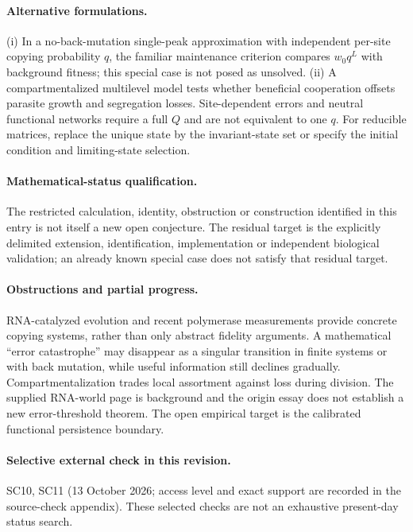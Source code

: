 \documentclass[11pt]{article}
\begin{document}
\paragraph{Alternative formulations.} (i) In a no-back-mutation single-peak approximation with independent per-site copying probability $q$, the familiar maintenance criterion compares $w_0q^L$ with background fitness; this special case is not posed as unsolved. (ii) A compartmentalized multilevel model tests whether beneficial cooperation offsets parasite growth and segregation losses. Site-dependent errors and neutral functional networks require a full $Q$ and are not equivalent to one $q$. For reducible matrices, replace the unique state by the invariant-state set or specify the initial condition and limiting-state selection.

\paragraph{Mathematical-status qualification.} The restricted calculation, identity, obstruction or construction identified in this entry is not itself a new open conjecture. The residual target is the explicitly delimited extension, identification, implementation or independent biological validation; an already known special case does not satisfy that residual target.

\paragraph{Obstructions and partial progress.} RNA-catalyzed evolution and recent polymerase measurements provide concrete copying systems, rather than only abstract fidelity arguments. A mathematical ``error catastrophe'' may disappear as a singular transition in finite systems or with back mutation, while useful information still declines gradually. Compartmentalization trades local assortment against loss during division. The supplied RNA-world page is background and the origin essay does not establish a new error-threshold theorem. The open empirical target is the calibrated functional persistence boundary.

\paragraph{Selective external check in this revision.} SC10, SC11 (13 October 2026; access level and exact support are recorded in the source-check appendix). These selected checks are not an exhaustive present-day status search.
\end{document}
